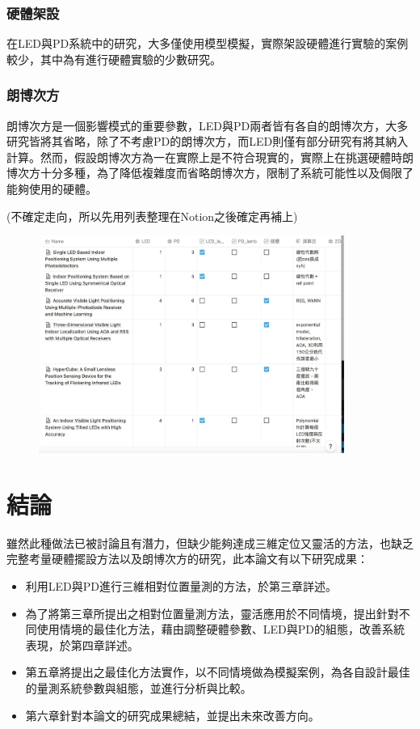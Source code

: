         \subsubsection{硬體架設}
        在LED與PD系統中的研究，大多僅使用模型模擬，實際架設硬體進行實驗的案例較少，其中\cite{case:hypercube}為有進行硬體實驗的少數研究。
        
        \subsubsection{朗博次方}
        朗博次方是一個影響模式的重要參數，LED與PD兩者皆有各自的朗博次方，大多研究皆將其省略，除了不考慮PD的朗博次方，而LED則僅有部分研究有將其納入計算\cite{case:cart2d}\cite{case:cart3d}。然而，假設朗博次方為一在實際上是不符合現實的，實際上在挑選硬體時朗博次方十分多種，為了降低複雜度而省略朗博次方，限制了系統可能性以及侷限了能夠使用的硬體。

        
        (不確定走向，所以先用列表整理在Notion之後確定再補上)

        \begin{figure}[ht]
            \centering
            \includegraphics[width=10cm]{00temppic/temp.png}
        \end{figure}



\section{結論}

雖然此種做法已被討論且有潛力，但缺少能夠達成三維定位又靈活的方法，也缺乏完整考量硬體擺設方法以及朗博次方的研究，此本論文有以下研究成果：

\begin{itemize}
    \item 利用LED與PD進行三維相對位置量測的方法，於第三章詳述。
    \item 為了將第三章所提出之相對位置量測方法，靈活應用於不同情境，提出針對不同使用情境的最佳化方法，藉由調整硬體參數、LED與PD的組態，改善系統表現，於第四章詳述。
    \item 第五章將提出之最佳化方法實作，以不同情境做為模擬案例，為各自設計最佳的量測系統參數與組態，並進行分析與比較。
    \item 第六章針對本論文的研究成果總結，並提出未來改善方向。
\end{itemize}